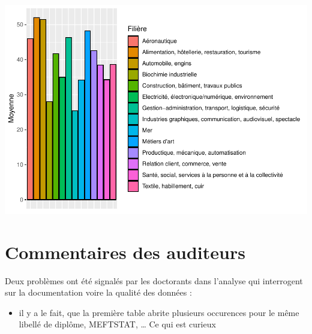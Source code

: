 \documentclass[
]{book}
\newenvironment{Shaded}{\begin{snugshade}}{\end{snugshade}}
\newcommand{\AttributeTok}[1]{\textcolor[rgb]{0.13,0.29,0.53}{#1}}
\newcommand{\DecValTok}[1]{\textcolor[rgb]{0.00,0.00,0.81}{#1}}
\newcommand{\FunctionTok}[1]{\textcolor[rgb]{0.13,0.29,0.53}{\textbf{#1}}}
\newcommand{\NormalTok}[1]{#1}
\newcommand{\OtherTok}[1]{\textcolor[rgb]{0.56,0.35,0.01}{#1}}
\newcommand{\SpecialCharTok}[1]{\textcolor[rgb]{0.81,0.36,0.00}{\textbf{#1}}}
\newcommand{\StringTok}[1]{\textcolor[rgb]{0.31,0.60,0.02}{#1}}
\providecommand{\tightlist}{%
  \setlength{\itemsep}{0pt}\setlength{\parskip}{0pt}}
\begin{document}
\includegraphics{_main_files/figure-latex/lycee11-1.pdf}

\hypertarget{commentaires-des-auditeurs}{%
\section{Commentaires des auditeurs}\label{commentaires-des-auditeurs}}

Deux problèmes ont été signalés par les doctorants dans l'analyse qui interrogent
sur la documentation voire la qualité des données :

\begin{itemize}
\tightlist
\item
  il y a le fait, que la première table abrite plusieurs occurences pour le même
  libellé de diplôme, MEFTSTAT, \ldots{} Ce qui est curieux
\end{itemize}

\begin{Shaded}
\end{Shaded}
\end{document}
